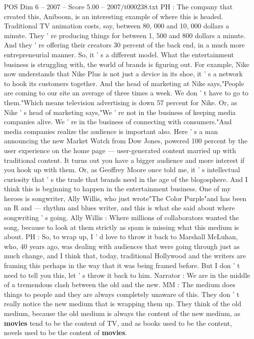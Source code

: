 \begin{textsample}{POS Dim 6 – 2007 – Score 5.00 – 2007/t000238.txt}
PH : The company that created this, Aniboom, is an interesting example of where this is headed.
Traditional TV animation costs, say, between 80, 000 and 10, 000 dollars a minute.
They ' re producing things for between 1, 500 and 800 dollars a minute.
And they ' re offering their creators 30 percent of the back end, in a much more entrepreneurial manner.
So, it ' s a different model.
What the entertainment business is struggling with, the world of brands is figuring out.
For example, Nike now understands that Nike Plus is not just a device in its shoe, it ' s a network to hook its customers together.
And the head of marketing at Nike says,"People are coming to our site an average of three times a week.
We don ' t have to go to them."Which means television advertising is down 57 percent for Nike.
Or, as Nike ' s head of marketing says,"We ' re not in the business of keeping media companies alive.
We ' re in the business of connecting with consumers."And media companies realize the audience is important also.
Here ' s a man announcing the new Market Watch from Dow Jones, powered 100 percent by the user experience on the home page — user-generated content married up with traditional content.
It turns out you have a bigger audience and more interest if you hook up with them.
Or, as Geoffrey Moore once told me, it ' s intellectual curiosity that ' s the trade that brands need in the age of the blogosphere.
And I think this is beginning to happen in the entertainment business.
One of my heroes is songwriter, Ally Willis, who just wrote"The Color Purple"and has been an R and — rhythm and blues writer, and this is what she said about where songwriting ' s going.
Ally Willis : Where millions of collaborators wanted the song, because to look at them strictly as spam is missing what this medium is about.
PH : So, to wrap up, I ' d love to throw it back to Marshall McLuhan, who, 40 years ago, was dealing with audiences that were going through just as much change, and I think that, today, traditional Hollywood and the writers are framing this perhaps in the way that it was being framed before.
But I don ' t need to tell you this, let ' s throw it back to him.
Narrator : We are in the middle of a tremendous clash between the old and the new.
MM : The medium does things to people and they are always completely unaware of this.
They don ' t really notice the new medium that is wrapping them up.
They think of the old medium, because the old medium is always the content of the new medium, as \textbf{movies} tend to be the content of TV, and as books used to be the content, novels used to be the content of \textbf{movies}.

\end{textsample}
